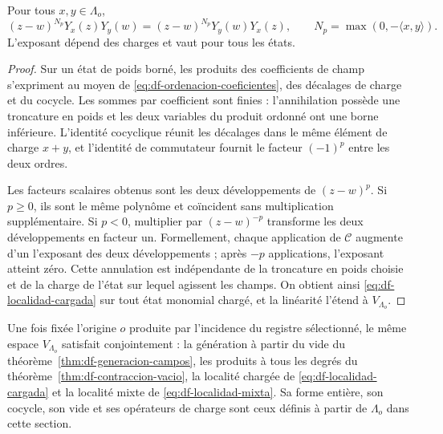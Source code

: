 \begin{theorem}
\label{thm:df-localidad-cargada}
Pour tous \(x,y\in\Lambda_o\),
\begin{equation}
 (z-w)^{N_p}Y_x(z)Y_y(w)
 =(z-w)^{N_p}Y_y(w)Y_x(z),
 \qquad N_p=\max(0,-\langle x,y\rangle).
 \label{eq:df-localidad-cargada}
\end{equation}
L’exposant dépend des charges et vaut pour tous les états.
\end{theorem}

\begin{proof}
Sur un état de poids borné, les produits des coefficients de champ s’expriment au moyen de \eqref{eq:df-ordenacion-coeficientes}, des décalages de charge et du cocycle. Les sommes par coefficient sont finies : l’annihilation possède une troncature en poids et les deux variables du produit ordonné ont une borne inférieure. L’identité cocyclique réunit les décalages dans le même élément de charge \(x+y\), et l’identité de commutateur fournit le facteur \((-1)^p\) entre les deux ordres.

Les facteurs scalaires obtenus sont les deux développements de \((z-w)^p\). Si \(p\geq0\), ils sont le même polynôme et coïncident sans multiplication supplémentaire. Si \(p<0\), multiplier par \((z-w)^{-p}\) transforme les deux développements en facteur un. Formellement, chaque application de \(\mathcal C\) augmente d’un l’exposant des deux développements ; après \(-p\) applications, l’exposant atteint zéro. Cette annulation est indépendante de la troncature en poids choisie et de la charge de l’état sur lequel agissent les champs. On obtient ainsi \eqref{eq:df-localidad-cargada} sur tout état monomial chargé, et la linéarité l’étend à \(V_{\Lambda_o}\).
\end{proof}

\begin{theorem}
\label{thm:df-composicion-campos} Une fois fixée l’origine \(o\) produite par l’incidence du registre sélectionné, le même espace \(V_{\Lambda_o}\) satisfait conjointement : la génération à partir du vide du théorème~\ref{thm:df-generacion-campos}, les produits à tous les degrés du théorème~\ref{thm:df-contraccion-vacio}, la localité chargée de \eqref{eq:df-localidad-cargada} et la localité mixte de \eqref{eq:df-localidad-mixta}. Sa forme entière, son cocycle, son vide et ses opérateurs de charge sont ceux définis à partir de \(\Lambda_o\) dans cette section.
\end{theorem}


